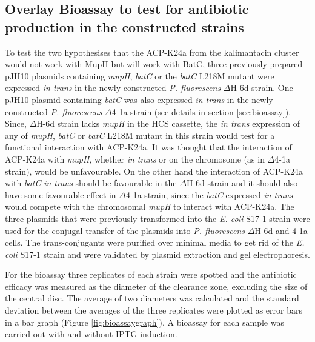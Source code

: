 	\subsection{Overlay Bioassay to test for antibiotic production in the constructed strains}
	\label{sec:chap4bioassay}	
	To test the two hypothesises that the ACP-K24a from the kalimantacin cluster would not work with MupH but will work with BatC, three previously prepared pJH10 plasmids containing \textit{mupH}, \textit{batC} or the \textit{batC} L218M mutant were expressed \textit{in trans} in the newly constructed \textit{P. fluorescens} $ \Delta $H-6d strain. One pJH10 plasmid containing \textit{batC} was also expressed \textit{in trans} in the newly constructed  \textit{P. fluorescens} $ \Delta $4-1a strain (see details in section \ref{sec:bioassay}). Since, $ \Delta $H-6d strain lacks \textit{mupH} in the HCS cassette, the \textit{in trans} expression of any of \textit{mupH}, \textit{batC} or \textit{batC} L218M mutant in this strain would test for a functional interaction with ACP-K24a. It was thought that the interaction of ACP-K24a with \textit{mupH}, whether \textit{in trans} or on the chromosome (as in  $ \Delta $4-1a strain), would be unfavourable. On the other hand the interaction of ACP-K24a with \textit{batC} \textit{in trans} should be favourable in the $ \Delta $H-6d strain and it should also have some favourable effect in $ \Delta $4-1a strain, since the \textit{batC} expressed \textit{in trans} would compete with the chromosomal \textit{mupH} to interact with ACP-K24a. The three plasmids that were previously transformed into the \textit{E. coli} S17-1 strain were used for the conjugal transfer of the plasmids into \textit{P. fluorescens} $ \Delta $H-6d and 4-1a cells. The trans-conjugants were purified over minimal media to get rid of the \textit{E. coli} S17-1 strain and were validated by plasmid extraction and gel electrophoresis.
	
	For the bioassay three replicates of each strain were spotted and the antibiotic efficacy was measured as the diameter of the clearance zone, excluding the size of the central disc. The average of two diameters was calculated and the standard deviation between the averages of the three replicates were plotted as error bars in a bar graph (Figure \ref{fig:bioassaygraph}). A bioassay for each sample was carried out with and without IPTG induction.
	
